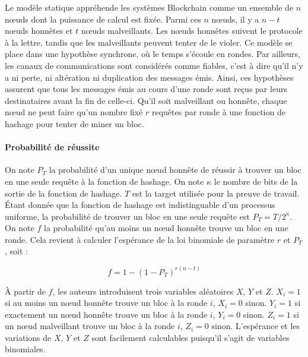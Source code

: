     Le modèle statique appréhende les systèmes Blockchain comme un ensemble de
    $n$ nœuds dont la puissance de calcul est fixée. Parmi ces $n$ nœuds, il y
    a $n-t$ nœuds honnêtes et $t$ nœuds malveillants. Les nœuds honnêtes suivent
    le protocole à la lettre, tandis que les malveillants peuvent tenter de le
    violer. Ce modèle se place dans une hypothèse synchrone, où le temps
    s'écoule en rondes. Par ailleurs, les canaux de communications sont
    considérés comme fiables, c'est à dire qu'il n'y a ni perte, ni altération
    ni duplication des messages émis. Ainsi, ces hypothèses assurent que tous
    les messages émis au cours d'une ronde sont reçus par leurs destinataires
    avant la fin de celle-ci. Qu'il soit malveillant ou honnête, chaque nœud ne
    peut faire qu'un nombre fixé $r$ requêtes par ronde à une fonction de
    hashage pour tenter de miner un bloc.

    \paragraph{Probabilité de réussite} On note $P_T$ la probabilité d'un unique
    nœud honnête de réussir à trouver un bloc en une seule requête à la fonction
    de hashage. On note $\kappa$ le nombre de bits de la sortie de la fonction
    de hashage. $T$ est la target utilisée pour la preuve de travail. Étant
    donnée que la fonction de hashage est indistinguable d'un processus
    uniforme, la probabilité de trouver un bloc en une seule requête est $P_T =
    T/2^\kappa$. On note $f$ la probabilité qu'au moins un nœud honnête trouve
    un bloc en une ronde. Cela revient à calculer l'espérance de la loi
    binomiale de paramètre $r$ et $P_T$, soit :

    \begin{equation}\label{eq:proba-bloc}
        f = 1 - (1 - P_T)^{r(n-t)}
    \end{equation}

    À partir de $f$, les auteurs introduisent trois variables aléatoires $X$,
    $Y$ et $Z$. $X_i = 1$ si au moins un nœud honnête trouve un bloc à la ronde
    $i$, $X_i = 0$ sinon. $Y_i = 1$ si exactement un nœud honnête trouve un bloc
    à la ronde $i$, $Y_i = 0$ sinon. $Z_i = 1$ si un nœud malveillant trouve un
    bloc à la ronde $i$, $Z_i = 0$ sinon. L'espérance et les variations de $X$,
    $Y$ et $Z$ sont facilement calculables puisqu'il s'agit de variables
    binomiales.

